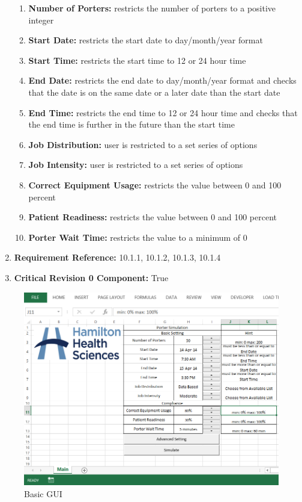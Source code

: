 \documentclass[paper=letter, fontsize=10pt]{scrartcl}
\numberwithin{equation}{section}		%
\numberwithin{figure}{section}			%
\numberwithin{table}{section}				%
\begin{document}
\begin{enumerate}[]
	\begin{enumerate}[]
		\item \textbf{Number of Porters:} restricts the number of porters to a positive integer 
		\item \textbf{Start Date:} restricts the start date to day/month/year format
		\item \textbf{Start Time:} restricts the start time to 12 or 24 hour time
		\item \textbf{End Date:} restricts the end date to day/month/year format and checks that the date is on the same date or a later date than the start date
		\item \textbf{End Time:} restricts the end time to 12 or 24 hour time and checks that the end time is further in the future than the start time
		\item \textbf{Job Distribution:} user is restricted to a set series of options
		\item \textbf{Job Intensity:} user is restricted to a set series of options
		\item \textbf{Correct Equipment Usage:} restricts the value between 0 and 100 percent 
		\item \textbf{Patient Readiness:} restricts the value between 0 and 100 percent
		\item \textbf{Porter Wait Time:} restricts the value to a minimum of 0		
	\end{enumerate}
	\item \textbf{Requirement Reference:} 10.1.1, 10.1.2, 10.1.3, 10.1.4
	\item \textbf{Critical Revision 0 Component:} True
\end{enumerate}

\newpage
\begin{figure}[H]
	\begin{center}
		\includegraphics[width=1\columnwidth]{../GUI_Mockups/BasicGUI.png}
		\caption{Basic GUI}
	\end{center}
\end{figure}
\newpage
\end{document}
